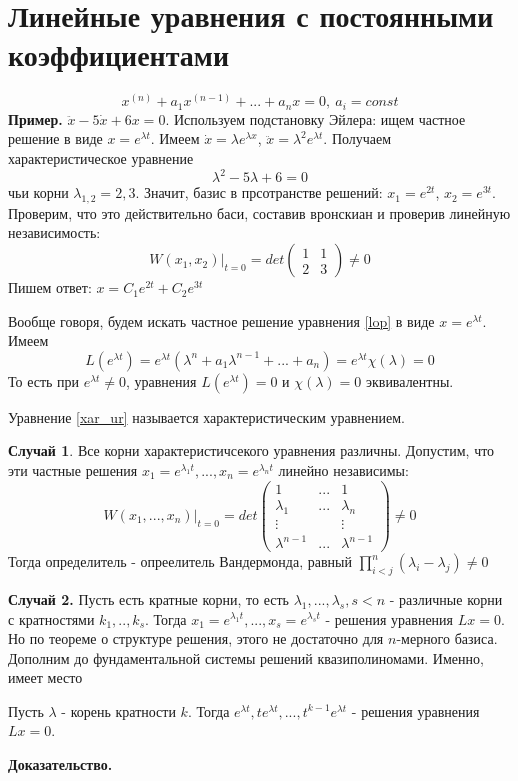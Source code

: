 \section{Линейные уравнения с постоянными коэффициентами}
\begin{equation}
    \label{lop}
    x^{(n)} + a_1x^{(n-1)} + ... +a_nx = 0,~a_i=const
\end{equation}
\textbf{Пример.} $\ddot x- 5\dot x + 6x = 0$. Используем подстановку 
Эйлера: ищем частное решение в виде $x=e^{\lambda t}$. Имеем
$\dot x = \lambda e^{\lambda x}$, $\ddot x = \lambda^2 e^{\lambda t}$. 
Получаем характеристическое уравнение 
$$\lambda^2 - 5\lambda + 6 = 0$$
чьи корни $\lambda_{1,2}=2,3$. Значит, базис в прсотранстве
решений: $x_1=e^{2t}$, $x_2=e^{3t}$. Проверим, что это действительно
баси, составив вронскиан и проверив линейную независимость: 
    $$W(x_1,x_2)\Big|_{t=0}=det \begin{pmatrix} 1 & 1 \\ 2 & 3 \end{pmatrix}
    \ne 0$$ 
Пишем ответ: $x=C_1e^{2t} + C_2e^{3t}$ 

Вообще говоря, будем искать частное решение уравнения \ref{lop} в виде
$x = e^{\lambda t}$. Имеем
\begin{equation}\label{xar_ur}
    L(e^{\lambda t}) = e^{\lambda t}(\lambda^n+a_1\lambda^{n-1}+...+a_n) =
    e^{\lambda t}\chi(\lambda) = 0
\end{equation}
То есть при $e^{\lambda t}\ne 0$, уравнения $L(e^{\lambda t})=0$ и
 $\chi(\lambda)=0$ эквивалентны.
\begin{defin}
    Уравнение \ref{xar_ur} называется характеристическим уравнением. 
\end{defin}
\textbf{Случай 1}. Все корни характеристичсекого уравнения различны. 
Допустим, что эти частные решения $x_1=e^{\lambda_1t},...,x_n=e^{\lambda_nt}$ 
линейно независимы: 
    $$W({x_1,...,x_n})|_{t=0} = det\begin{pmatrix} 1&...&1\\
        \lambda_1&...&\lambda_n\\ \vdots&&\vdots \\
        \lambda^{n-1}&...&\lambda^{n-1}


    \end{pmatrix}\ne 0 $$
Тогда определитель - опреелитель Вандермонда, равный 
$\prod\limits_{i<j}^{n} (\lambda_i-\lambda_j)\ne 0 $


\textbf{Случай 2.} Пусть есть кратные корни, то есть 
$\lambda_1,...,\lambda_s,s<n$ - различные корни с кратностями
$k_1,..,k_s$. Тогда $x_1=e^{\lambda_1t},...,x_s=e^{\lambda_st}$ - 
решения уравнения $Lx=0$. Но по теореме о структуре решения, этого не 
достаточно для $n$-мерного базиса. Дополним до фундаментальной системы 
решений квазиполиномами. Именно, имеет место 
\begin{theor}
Пусть $\lambda$ - корень кратности $k$. Тогда 
$e^{\lambda t},te^{\lambda t},...,t^{k-1}e^{\lambda t}$ - решения 
уравнения $Lx=0$.  
\end{theor}
\textbf{Доказательство.}  

